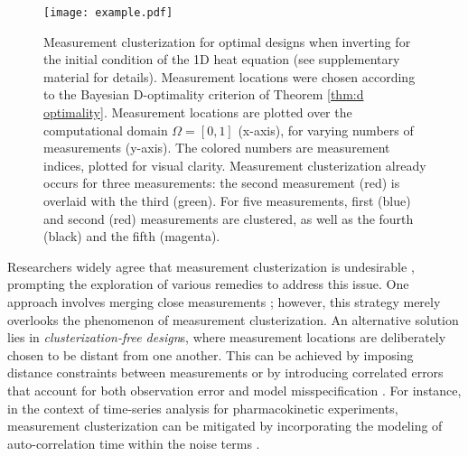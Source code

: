 \begin{figure}
    \centering
    \texttt{[image: example.pdf]}
    \caption{Measurement clusterization for optimal designs when
      inverting for the initial condition of the 1D heat equation (see
      supplementary material for details). Measurement locations were
      chosen according to the Bayesian D-optimality criterion of
      Theorem \ref{thm:d optimality}. Measurement locations are
      plotted over the computational domain \(\Omega = [0, 1]\)
      (x-axis), for varying numbers of measurements (y-axis). The
      colored numbers are measurement indices, plotted for visual
      clarity. Measurement clusterization already occurs for three
      measurements: the second measurement (red) is overlaid with the
      third (green). For five measurements, first (blue) and second
      (red) measurements are clustered, as well as the fourth (black)
      and the fifth (magenta).}
  \label{fig:clusterization illustration}
\end{figure}


Researchers widely agree that measurement clusterization is
undesirable \cite{fedorov1996, nyberg2012, fedorov1997, Ucinski05,
  neitzel2019sparse}, prompting the exploration of various remedies to
address this issue. One approach involves merging close measurements
\cite{fedorov1997}; however, this strategy merely overlooks the
phenomenon of measurement clusterization. An alternative solution lies
in \emph{clusterization-free design}s, where measurement locations are
deliberately chosen to be distant from one another. This can be
achieved by imposing distance constraints between measurements or by
introducing correlated errors that account for both observation error
and model misspecification \cite{Ucinski05}. For instance, in the
context of time-series analysis for pharmacokinetic experiments,
measurement clusterization can be mitigated by incorporating the
modeling of auto-correlation time within the noise terms
\cite{nyberg2012}.


